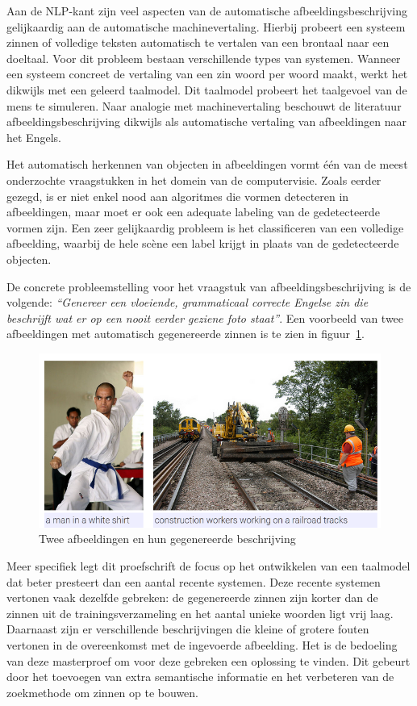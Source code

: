 Aan de NLP-kant zijn veel aspecten van de automatische afbeeldingsbeschrijving gelijkaardig aan de automatische machinevertaling. Hierbij probeert een systeem zinnen of volledige teksten automatisch te vertalen van een brontaal naar een doeltaal. Voor dit probleem bestaan verschillende types van systemen. Wanneer een systeem concreet de vertaling van een zin woord per woord maakt, werkt het dikwijls met een geleerd taalmodel. Dit taalmodel probeert het taalgevoel van de mens te simuleren. Naar analogie met machinevertaling beschouwt de literatuur afbeeldingsbeschrijving dikwijls als automatische vertaling van afbeeldingen naar het Engels.

Het automatisch herkennen van objecten in afbeeldingen vormt \'e\'en van de meest onderzochte vraagstukken in het domein van de computervisie. Zoals eerder gezegd, is er niet enkel nood aan algoritmes die vormen detecteren in afbeeldingen, maar moet er ook een adequate labeling van de gedetecteerde vormen zijn. Een zeer gelijkaardig probleem is het classificeren van een volledige afbeelding, waarbij de hele sc\`ene een label krijgt in plaats van de gedetecteerde objecten.

De concrete probleemstelling voor het vraagstuk van afbeeldingsbeschrijving is de volgende: \emph{``Genereer een vloeiende, grammaticaal correcte Engelse zin die beschrijft wat er op een nooit eerder geziene foto staat''}. Een voorbeeld van twee afbeeldingen met automatisch gegenereerde zinnen is te zien in figuur~\ref{fig:examplecaptions}.

\begin{figure}[tb]
    \centering
    \includegraphics[width= 0.85\linewidth]{Images/caption.png}
    \caption{Twee afbeeldingen en hun gegenereerde beschrijving}
    \label{fig:examplecaptions}
\end{figure}

Meer specifiek legt dit proefschrift de focus op het ontwikkelen van een taalmodel dat beter presteert dan een aantal recente systemen. Deze recente systemen vertonen vaak dezelfde gebreken: de gegenereerde zinnen zijn korter dan de zinnen uit de trainingsverzameling en het aantal unieke woorden ligt vrij laag. Daarnaast zijn er verschillende beschrijvingen die kleine of grotere fouten vertonen in de overeenkomst met de ingevoerde afbeelding. Het is de bedoeling van deze masterproef om voor deze gebreken een oplossing te vinden. Dit gebeurt door het toevoegen van extra semantische informatie en het verbeteren van de zoekmethode om zinnen op te bouwen.


